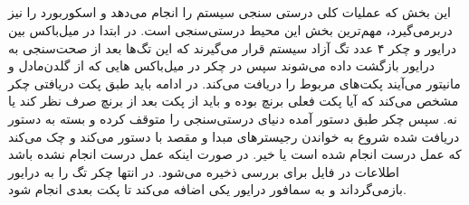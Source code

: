 \documentclass[a4paper, 11pt]{article}
\begin{document}
\subsection{}
این بخش که عملیات کلی درستی سنجی سیستم را انجام می‌دهد و اسکوربورد را نیز دربرمی‌گیرد،
مهم‌ترین بخش این محیط درستی‌سنجی است.
در ابتدا در میل‌باکس بین درایور و چکر ۴ عدد تگ آزاد سیستم قرار می‌گیرند
که این تگ‌ها بعد از صحت‌سنجی به درایور بازگشت داده می‌شوند
سپس در چکر در میل‌باکس هایی که از گلدن‌مادل و مانیتور می‌آیند
پکت‌های مربوط را دریافت می‌کند.
در ادامه باید طبق پکت دریافتی چکر مشخص می‌کند که آیا پکت فعلی برنچ بوده و باید از پکت بعد
از برنچ صرف نظر‌ کند یا نه.
سپس چکر طبق دستور آمده دنیای درستی‌سنجی را متوقف کرده و بسته به دستور دریافت شده
شروع به خواندن رجیستر‌های مبدا و مقصد با دستور
می‌کند و چک می‌کند که عمل درست انجام شده است یا خیر.
در صورت اینکه عمل درست انجام نشده باشد اطلاعات در فایل
برای بررسی ذخیره می‌شود.
در انتها چکر تگ را به درایور بازمی‌گرداند و به سمافور درایور یکی اضافه می‌کند تا پکت بعدی انجام شود.
\end{document}
